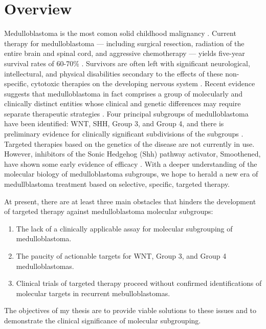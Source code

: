 \documentclass[11pt,letterpaper]{article}
\theoremstyle{definition}
\begin{document}


\section{Overview}

Medulloblastoma is the most comon solid childhood malignancy . Current therapy for medulloblastoma --- including surgical resection, radiation of the entire brain and spinal cord, and aggressive chemotherapy --- yields five-year survival rates of 60-70\% . Survivors are often left with significant neurological, intellectural, and physical disabilities secondary to the effects of these non-specific, cytotoxic therapies on the developing nervous system .
Recent evidence suggests that medulloblastoma in fact comprises a group of molecularly and clinically distinct entities whose clinical and genetic differences may require separate therapeutic strategies . Four principal subgroups of medulloblastoma have been identified: WNT, SHH, Group 3, and Group 4, and there is preliminary evidence for clinically significant subdivisions of the subgroups . Targeted therapies based on the genetics of the disease are not currently in use. However, inhibitors of the Sonic Hedgehog (Shh) pathway activator, Smoothened, have shown some early evidence of efficacy . With a deeper understanding of the molecular biology of medulloblastoma subgroups, we hope to herald a new era of medullblastoma treatment based on selective, specific, targeted therapy.

At present, there are at least three main obstacles that hinders the development of targeted therapy against medulloblastoma molecular subgroups:

\begin{enumerate}
	\item The lack of a clinically applicable assay for molecular subgrouping of medulloblastoma.
	\item The paucity of actionable targets for WNT, Group 3, and Group 4 medulloblastomas.
	\item Clinical trials of targeted therapy proceed without confirmed identifications of molecular targets in recurrent mebulloblastomas.
\end{enumerate}

The objectives of my thesis are to provide viable solutions to these issues and to demonstrate the clinical significance of molecular subgrouping.
\end{document}
